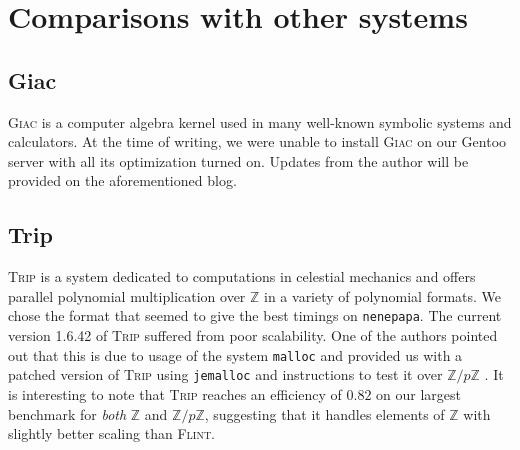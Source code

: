 \documentclass{deliverablereport}
\begin{document}
\section{Comparisons with other systems}
\subsection{Giac}
\textsc{Giac} \cite{Giac} is a computer algebra kernel used in many
well-known symbolic systems and calculators. At the time of writing,
we were unable to install \textsc{Giac} on our Gentoo server with all
its optimization turned on. Updates from the author will be provided
on the aforementioned blog.

\subsection{Trip}
\textsc{Trip} \cite{Gastineau:2011:TCA:1940475.1940518} is a system dedicated to computations in celestial mechanics and offers parallel polynomial multiplication over $\mathbb{Z}$ in a variety of polynomial formats. We chose the format that seemed to give the best timings on {\tt nenepapa}. The current version 1.6.42 of \textsc{Trip} suffered from poor scalability. One of the authors pointed out that this is due to usage of the system {\tt malloc} and provided us with a patched version of \textsc{Trip} using {\tt jemalloc} and instructions to test it over $\mathbb{Z}/p\mathbb{Z}$ . It is interesting to note that \textsc{Trip} reaches an efficiency of $0.82$ on our largest benchmark for \emph{both} $\mathbb{Z}$ and $\mathbb{Z}/p\mathbb{Z}$, suggesting that it handles elements of $\mathbb{Z}$ with slightly better scaling than \textsc{Flint}.
\end{document}
